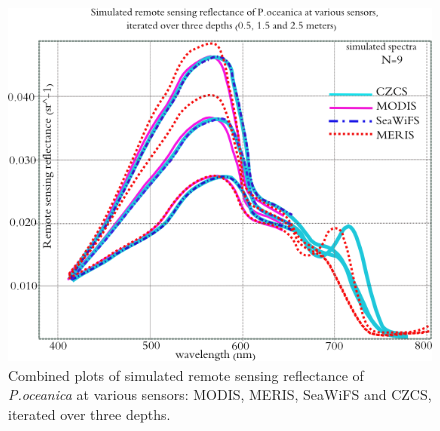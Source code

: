 \documentclass[11pt]{article}
\begin{document}
\begin{figure}
	\centering
	\includegraphics[scale=0.45]{Sensors.png}
	\caption{Combined plots of simulated remote sensing reflectance of \textit{P.oceanica} at various sensors: MODIS, MERIS, SeaWiFS and CZCS, iterated over three depths.}
	\label{fig:4.6}
\end{figure}
\end{document}
